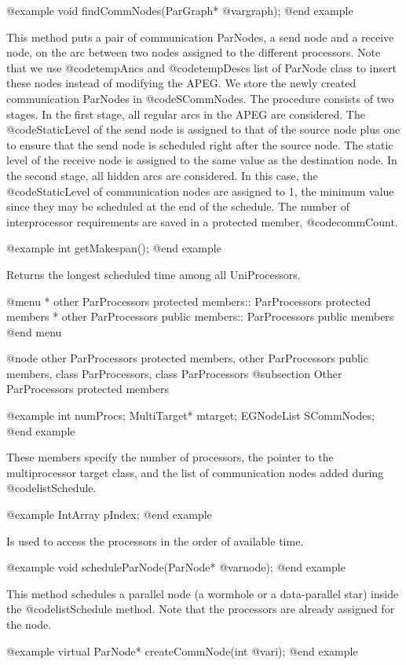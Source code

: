 @example
void findCommNodes(ParGraph* @var{graph});
@end example

This method puts a pair of communication ParNodes, a send node and a
receive node, on the arc between two nodes assigned to the different 
processors. Note that we use @code{tempAncs} and @code{tempDescs}
list of ParNode class to insert these nodes instead of modifying the APEG. 
We store the newly created communication ParNodes
in @code{SCommNodes}. The procedure consists of
two stages. In the first stage, all regular arcs in the APEG are considered.
The @code{StaticLevel} of the send node is assigned to that of the source node
plus one to ensure that the send node is scheduled right after the source
node. The static level of the receive node is assigned to the same value
as the destination node.
In the second stage, all hidden arcs are considered. In this case, the
@code{StaticLevel} of communication nodes are assigned to 1, the minimum
value since they may be scheduled at the end of the schedule.
The number of interprocessor requirements are saved in a protected member,
@code{commCount}.

@example
int getMakespan();
@end example

Returns the longest scheduled time among all UniProcessors.

@menu
* other ParProcessors protected members::	ParProcessors protected members
* other ParProcessors public members::	ParProcessors public members
@end menu

@node other ParProcessors protected members, other ParProcessors public members, class ParProcessors, class ParProcessors
@subsection Other ParProcessors protected members

@example
int numProcs;
MultiTarget* mtarget;
EGNodeList SCommNodes;
@end example

These members specify the number of processors, the pointer to the
multiprocessor target class, and the list of communication nodes added
during @code{listSchedule}.

@example
IntArray pIndex;
@end example

Is used to access the processors in the order of available time. 

@example
void scheduleParNode(ParNode* @var{node});
@end example

This method schedules a parallel node (a wormhole or a data-parallel star)
inside the @code{listSchedule} method. Note that the processors are
already assigned for the node.

@example
virtual ParNode* createCommNode(int @var{i});
@end example

